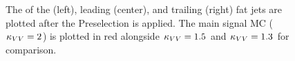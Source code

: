 \begin{figure}[htb]
    \centering
    \qquad
    \qquad
    \caption{
        The \pt of the \Htobb (left), leading \Vtoqq (center), and trailing \Vtoqq (right) fat jets are plotted after the Preselection is applied. 
        The main signal MC ($\kappa_{VV} = 2$) is plotted in red alongside $\kappa_{VV} = 1.5$ and $\kappa_{VV} = 1.3$ for comparison. 
    }
    \label{fig:vbsvvh_fatjet_pts}
\end{figure}

